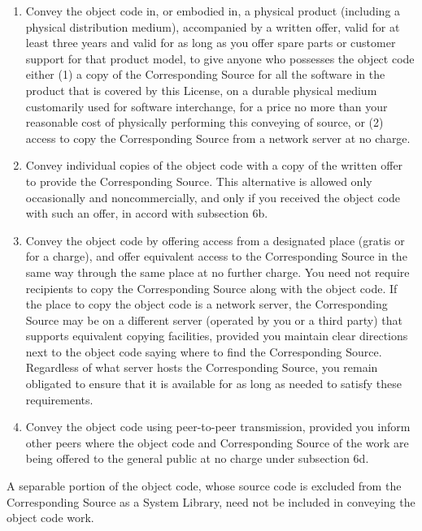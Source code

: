 \begin{enumerate}
\begin{enumerate}
  \item Convey the object code in, or embodied in, a physical product
  (including a physical distribution medium), accompanied by a
  written offer, valid for at least three years and valid for as
  long as you offer spare parts or customer support for that product
  model, to give anyone who possesses the object code either (1) a
  copy of the Corresponding Source for all the software in the
  product that is covered by this License, on a durable physical
  medium customarily used for software interchange, for a price no
  more than your reasonable cost of physically performing this
  conveying of source, or (2) access to copy the
  Corresponding Source from a network server at no charge.

  \item Convey individual copies of the object code with a copy of the
  written offer to provide the Corresponding Source.  This
  alternative is allowed only occasionally and noncommercially, and
  only if you received the object code with such an offer, in accord
  with subsection 6b.

  \item Convey the object code by offering access from a designated
  place (gratis or for a charge), and offer equivalent access to the
  Corresponding Source in the same way through the same place at no
  further charge.  You need not require recipients to copy the
  Corresponding Source along with the object code.  If the place to
  copy the object code is a network server, the Corresponding Source
  may be on a different server (operated by you or a third party)
  that supports equivalent copying facilities, provided you maintain
  clear directions next to the object code saying where to find the
  Corresponding Source.  Regardless of what server hosts the
  Corresponding Source, you remain obligated to ensure that it is
  available for as long as needed to satisfy these requirements.

  \item Convey the object code using peer-to-peer transmission, provided
  you inform other peers where the object code and Corresponding
  Source of the work are being offered to the general public at no
  charge under subsection 6d.
  \end{enumerate}

A separable portion of the object code, whose source code is excluded
from the Corresponding Source as a System Library, need not be
included in conveying the object code work.


\end{enumerate}
